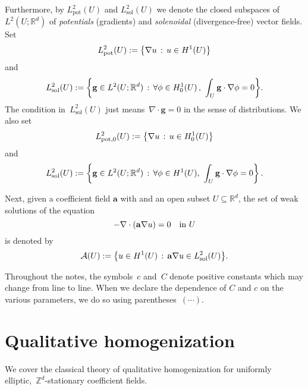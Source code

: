 \documentclass[11pt]{article} %
\numberwithin{equation}{section}
\theoremstyle{definition}
\let\originalleft\left
\let\originalright\right
\renewcommand{\left}{\mathopen{}\mathclose\bgroup\originalleft}
\renewcommand{\right}{\aftergroup\egroup\originalright}
\newcommand*{\Zd}{\ensuremath{\mathbb{Z}^d}}
\newcommand*{\Rd}{\ensuremath{\mathbb{R}^d}}
\newcommand{\g}{\mathbf{g}}
\renewcommand{\a}{\mathbf{a}}
\newcommand{\A}{\mathcal{A}}
\newcommand{\Lsol}{L^2_{\mathrm{sol}}}
\newcommand{\Lpot}{L^2_{\mathrm{pot}}}
\newcommand{\Lpoto}{L^2_{\mathrm{pot,0}}}
\begin{document}
Furthermore, by $\Lpot(U)$ and $\Lsol(U)$ we denote the closed subspaces of $L^2(U;\Rd)$ 
of \emph{potentials} (gradients) and \emph{solenoidal} (divergence-free) vector fields. Set 
\begin{equation}
\label{e.Lpot.not}
\Lpot(U):= \left\{ \nabla u \,:\,  u \in H^1(U) \right\}
\end{equation}
and
\begin{equation}
\label{e.Ls.not}
\Lsol(U):= \left\{ \g \in L^2(U;\Rd) \,:\,  \forall \phi\in H^1_0(U)  \,, \ \int_U \g\cdot \nabla \phi = 0 \right\}.
\end{equation}
The condition in~$\Lsol(U)$ just means~$\nabla \cdot \g = 0$ in the sense of distributions.  We also set 
\begin{equation} 
\label{e.def.Lp0}
\Lpoto(U):= \left\{ \nabla u \,:\, u\in H^1_0(U) \right\}
\end{equation}
and
\begin{equation}
\label{e.def.Ls0}
\Lsol(U):= \left\{ \g \in L^2(U;\Rd) \,:\, \forall \phi\in H^1(U), \ \int_U \g\cdot \nabla \phi = 0 \right\}
\,.
\end{equation}

\smallskip

Next, given a coefficient field $\a$ with  and an open subset $U\subseteq \Rd$, the set of weak solutions of the equation
\begin{equation*} \label{}
-\nabla \cdot \left( \a\nabla u \right)  = 0 \quad \mbox{in} \ U
\end{equation*}
is denoted by 
\begin{equation} \label{e.def.A(U)}
\A(U) := \left\{ u\in H^1(U)\,:\,\a\nabla u \in L^2_{\mathrm{sol}}(U) \right\}.
\end{equation}

\smallskip

Throughout the notes, the symbols~$c$ and~$C$ denote positive constants which may change from line to line. When we declare the dependence of $C$ and $c$ on the various parameters, we do so using parentheses~$(\cdots)$. 





\section{Qualitative homogenization}
\label{s.qualitativetheory}

We cover the classical theory of qualitative homogenization for uniformly elliptic,~$\Zd$-stationary coefficient fields. 
\end{document}
